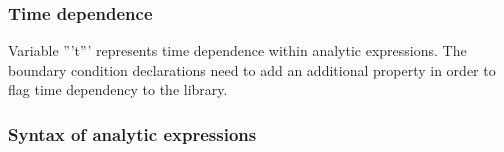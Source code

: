\subsubsection{Time dependence}

Variable '''t''' represents time dependence within analytic expressions. The
boundary condition declarations need to add an additional property
 in order to flag time dependency to
the library.


\subsubsection{Syntax of analytic expressions}

